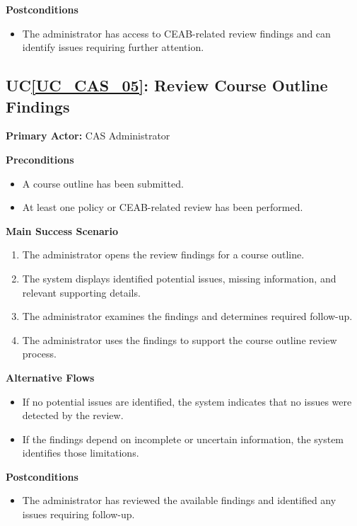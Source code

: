 \documentclass[12pt]{article}
\newcounter{ucnum} %
\newcommand{\ucref}[1]{UC\ref{#1}}
\begin{document}
\noindent \textbf{Postconditions}
\begin{itemize}
  \item The administrator has access to CEAB-related review findings and can identify issues requiring further attention.
\end{itemize}



 \label{UC_CAS_05}
\subsection{\ucref{UC_CAS_05}: Review Course Outline Findings}

\noindent \textbf{Primary Actor:} CAS Administrator

\noindent \textbf{Preconditions}
\begin{itemize}
  \item A course outline has been submitted.
  \item At least one policy or CEAB-related review has been performed.
\end{itemize}

\noindent \textbf{Main Success Scenario}
\begin{enumerate}
  \item The administrator opens the review findings for a course outline.
  \item The system displays identified potential issues, missing information, and relevant supporting details.
  \item The administrator examines the findings and determines required follow-up.
  \item The administrator uses the findings to support the course outline review process.
\end{enumerate}

\noindent \textbf{Alternative Flows}
\begin{itemize}
  \item If no potential issues are identified, the system indicates that no issues were detected by the review.
  \item If the findings depend on incomplete or uncertain information, the system identifies those limitations.
\end{itemize}

\noindent \textbf{Postconditions}
\begin{itemize}
  \item The administrator has reviewed the available findings and identified any issues requiring follow-up.
\end{itemize}
\end{document}

